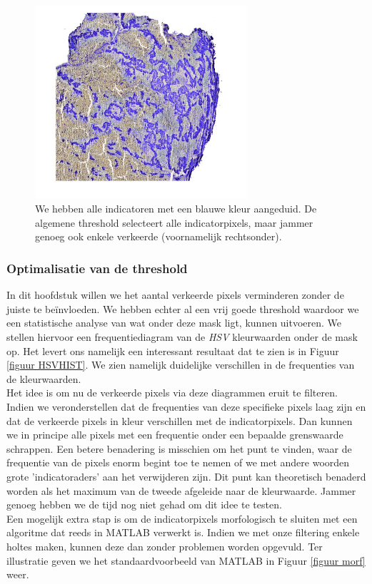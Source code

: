 \documentclass[a4paper,kulak]{kulakarticle}
\begin{document}
	\begin{figure}[h]
		\centering
		\includegraphics[width = 0.7\textwidth]{algemene_threshold}
		
		\caption{We hebben alle indicatoren met een blauwe kleur aangeduid. De algemene threshold selecteert alle indicatorpixels, maar jammer genoeg ook enkele verkeerde (voornamelijk rechtsonder).}
		\label{figuur alg_tresh}
	\end{figure}

	\subsubsection{Optimalisatie van de threshold}
		In dit hoofdstuk willen we het aantal verkeerde pixels verminderen zonder de juiste te beïnvloeden. We hebben echter al een vrij goede threshold waardoor we een statistische analyse van wat onder deze mask ligt, kunnen uitvoeren. We stellen hiervoor een frequentiediagram van de \textit{HSV} kleurwaarden onder de mask op. Het levert ons namelijk een interessant resultaat dat te zien is in Figuur  \ref{figuur HSVHIST}. We zien namelijk duidelijke verschillen in de frequenties van de kleurwaarden. \\
		Het idee is om nu de verkeerde pixels via deze diagrammen eruit te filteren. Indien we veronderstellen dat de frequenties van deze specifieke pixels laag zijn en dat de verkeerde pixels in kleur verschillen met de indicatorpixels. Dan kunnen we in principe alle pixels met een frequentie onder een bepaalde grenswaarde schrappen. Een betere benadering is misschien om het punt te vinden, waar de frequentie van de pixels enorm begint toe te nemen of we met andere woorden grote 'indicatoraders' aan het verwijderen zijn. Dit punt kan theoretisch benaderd worden als het maximum van de tweede afgeleide naar de kleurwaarde. Jammer genoeg hebben we de tijd nog niet gehad om dit idee te testen. \\
		Een mogelijk extra stap is om de indicatorpixels morfologisch te sluiten met een algoritme dat reeds in MATLAB verwerkt is. Indien we met onze filtering enkele holtes maken, kunnen deze dan zonder problemen worden opgevuld. Ter illustratie geven we het standaardvoorbeeld van MATLAB in Figuur \ref{figuur morf} weer.
\end{document}
